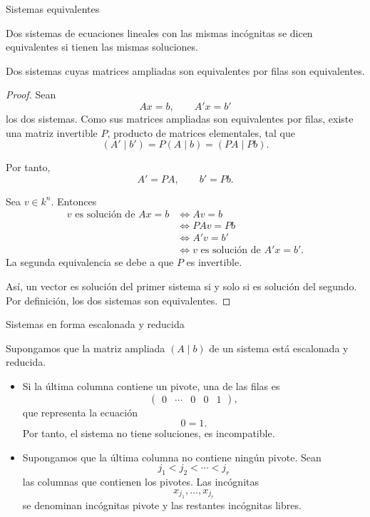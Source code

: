 \begin{frame}[allowframebreaks, t]{Sistemas equivalentes}

\begin{definition}
Dos sistemas de ecuaciones lineales con las mismas incógnitas se dicen
\alert{equivalentes} si tienen las mismas soluciones.
\end{definition}

\begin{proposition}
Dos sistemas cuyas matrices ampliadas son equivalentes por filas
son equivalentes.
\end{proposition}

\begin{proof}
Sean
\[
Ax=b,
\qquad
A'x=b'
\]
los dos sistemas. Como sus matrices ampliadas son equivalentes por
filas, existe una matriz invertible \(P\), producto de matrices
elementales, tal que
\[
(A'\mid b')=P(A\mid b)=(PA\mid Pb).
\]

\framebreak

Por tanto,
\[
A'=PA,
\qquad
b'=Pb.
\]

Sea \(v\in k^n\). Entonces
\[
\begin{aligned}
v\text{ es solución de }Ax=b
&\iff Av=b\\
&\iff PAv=Pb\\
&\iff A'v=b'\\
&\iff v\text{ es solución de }A'x=b'.
\end{aligned}
\]
La segunda equivalencia se debe a que \(P\) es invertible.

\medskip

Así, un vector es solución del primer sistema si y solo si es
solución del segundo. Por definición, los dos sistemas son
equivalentes.
\end{proof}

\end{frame}

\begin{frame}{Sistemas en forma escalonada y reducida}

Supongamos que la matriz ampliada \((A\mid b)\) de un sistema
está escalonada y reducida.

\begin{itemize}
\item Si la última columna contiene un pivote, una de las filas es
\[
\left(
\begin{array}{cccc|c}
0&\cdots&0&0&1
\end{array}
\right),
\]
que representa la ecuación
\[
0=1.
\]
Por tanto, el sistema no tiene soluciones, es \alert{incompatible}.

\item Supongamos que la última columna no contiene ningún pivote.
Sean
\[
j_1<j_2<\cdots<j_r
\]
las columnas que contienen los pivotes. Las incógnitas
\[
x_{j_1},\ldots,x_{j_r}
\]
se denominan \alert{incógnitas pivote} y las restantes
\alert{incógnitas libres}.
\end{itemize}

\end{frame}

